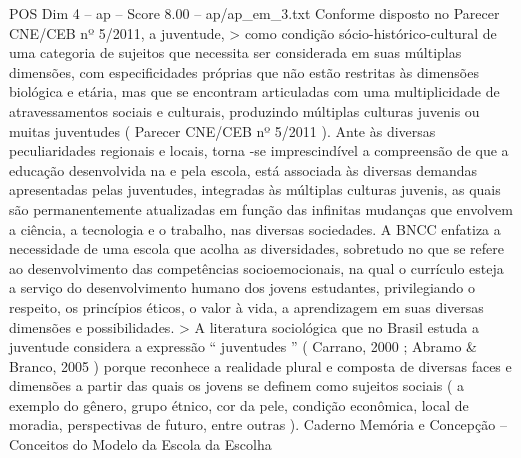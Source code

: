 \begin{textsample}{POS Dim 4 – ap – Score 8.00 – ap/ap\_em\_3.txt}
Conforme disposto no Parecer CNE/CEB nº 5/2011, a juventude, > como condição sócio-histórico-cultural de uma categoria de sujeitos que necessita ser considerada em suas múltiplas dimensões, com especificidades próprias que não estão restritas às dimensões biológica e etária, mas que se encontram articuladas com uma multiplicidade de atravessamentos sociais e culturais, produzindo múltiplas culturas juvenis ou muitas juventudes ( Parecer CNE/CEB nº 5/2011 ).
Ante às diversas peculiaridades regionais e locais, torna -se imprescindível a compreensão de que a educação desenvolvida na e pela escola, está associada às diversas demandas apresentadas pelas juventudes, integradas às múltiplas culturas juvenis, as quais são permanentemente atualizadas em função das infinitas mudanças que envolvem a ciência, a tecnologia e o trabalho, nas diversas sociedades.
A BNCC enfatiza a necessidade de uma escola que acolha as diversidades, sobretudo no que se refere ao desenvolvimento das competências socioemocionais, na qual o currículo esteja a serviço do desenvolvimento humano dos jovens estudantes, privilegiando o respeito, os princípios éticos, o valor à vida, a aprendizagem em suas diversas dimensões e possibilidades. > A literatura sociológica que no Brasil estuda a juventude considera a expressão “ juventudes ” ( Carrano, 2000 ; Abramo \& Branco, 2005 ) porque reconhece a realidade plural e composta de diversas faces e dimensões a partir das quais os jovens se definem como sujeitos sociais ( a exemplo do gênero, grupo étnico, cor da pele, condição econômica, local de moradia, perspectivas de futuro, entre outras ).
Caderno Memória e Concepção – Conceitos do Modelo da Escola da Escolha

\end{textsample}
